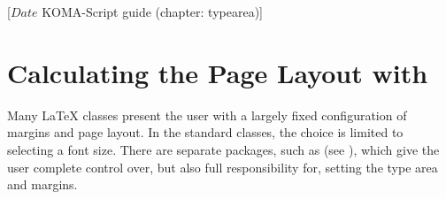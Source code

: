 %
%
%
%
%
%
%
%
% 
%
%
%
%

%
                 [$Date$
                  KOMA-Script guide (chapter: typearea)]


\chapter{Calculating the Page Layout with }

\BeginIndexGroup%
%
Many {\LaTeX} classes present the
user with a largely fixed configuration of margins and page layout. In the
standard classes, the choice is limited to selecting a font size.
There are separate packages, such as 
(see \cite{package:geometry}), which give the user complete control over, but
also full responsibility for, setting the type area and margins.

